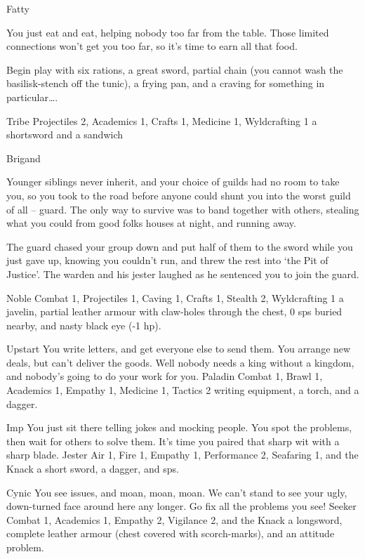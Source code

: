 \begin{multicols}{2}
\begin{itemize}
    {Fatty}%
    {
      You just eat and eat, helping nobody too far from the table.
      Those limited connections won't get you too far, so it's time to earn all that food.

      Begin play with six rations, a great sword, partial chain (you cannot wash the basilisk-stench off the tunic), a frying pan, and a craving for something in particular\ldots.
    }%
    {Tribe}%
    {Projectiles 2, Academics 1, Crafts 1, Medicine 1, Wyldcrafting 1}%
    {a shortsword and a sandwich}%

    {Brigand}%
    {
  Younger siblings never inherit, and your choice of guilds had no room to take you, so you took to the road before anyone could shunt you into the worst guild of all -- \gls{guard}.
  The only way to survive was to band together with others, stealing what you could from good folks houses at night, and running away.

  The \gls{guard} chased your group down and put half of them to the sword while you just gave up, knowing you couldn't run, and threw the rest into `the Pit of Justice'.
  The warden and his jester laughed as he sentenced you to join the \gls{guard}.
  }%
  {Noble}%
  {Combat 1, Projectiles 1, Caving 1, Crafts 1, Stealth 2, Wyldcrafting 1}%
  {a javelin, partial leather armour with claw-holes through the chest, 0 \glspl{sp} buried nearby, and nasty black eye (-1 \gls{hp}).}%


  {Upstart}%
  {You write letters, and get everyone else to send them.
  You arrange new deals, but can't deliver the goods.
  Well nobody needs a king without a kingdom, and nobody's going to do your work for you.
  }%
  {Paladin}%
  {Combat 1, Brawl 1, Academics 1, Empathy 1, Medicine 1, Tactics 2}%
  {writing equipment, a torch, and a dagger.}%

  {Imp}%
  {You just sit there telling jokes and mocking people.
  You spot the problems, then wait for others to solve them.
  It's time you paired that sharp wit with a sharp blade.
  }%
  {Jester}%
  {Air 1, Fire 1, Empathy 1, Performance 2, Seafaring 1, and the Knack \snapcaster}%
  {a short sword, a dagger, and  \glspl{sp}.}%

  {Cynic}%
  {You see issues, and moan, moan, moan.
  We can't stand to see your ugly, down-turned face around here any longer.
  Go fix all the problems you see!
  }%
  {Seeker}%
  {Combat 1, Academics 1, Empathy 2, Vigilance 2, and the Knack \adrenalinesurge}%
  {a longsword, complete leather armour (chest covered with scorch-marks), and an attitude problem.}%



\end{itemize}
\end{multicols}
